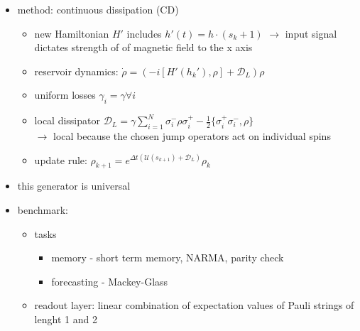 \begin{itemize}
\begin{itemize}
        \item $L_i$: Jump operator, $\gamma_i$: dissipation rate
        \item here $L_i = \sigma_i^- = \frac{1}{2}(\sigma_i^x - i\sigma_i^y)$
    \end{itemize}
    \item method: continuous dissipation (CD)
    \begin{itemize}
        \item new Hamiltonian $H'$ includes $h'(t) = h\cdot(s_k+1)$ $\to$ input signal dictates strength of of magnetic field to the x axis
        \item reservoir dynamics: $\dot{\rho} = (-i[H'(h_k'), \rho]+\mathcal{D}_L)\rho$
        \item uniform losses $\gamma_i = \gamma \forall i$
        \item local dissipator $\mathcal{D}_L = \gamma \sum_{i=1}^{N} \sigma_i^- \rho \sigma_i^+ - \frac{1}{2}\{\sigma_i^+\sigma_i^-, \rho\}$ \\
        $\to$ local because the chosen jump operators act on individual spins
        \item update rule: $\rho_{k+1} = e^{\Delta t(\mathcal{U}(s_{k+1})+\mathcal{D}_L)}\rho_k$
    \end{itemize}
    \item this generator is universal
    \item benchmark:
    \begin{itemize}
        \item tasks
        \begin{itemize}
            \item memory - short term memory, NARMA, parity check
            \item forecasting - Mackey-Glass
        \end{itemize}
        \item readout layer: linear combination of expectation values of Pauli strings of lenght 1 and 2
    \end{itemize}
\end{itemize}

